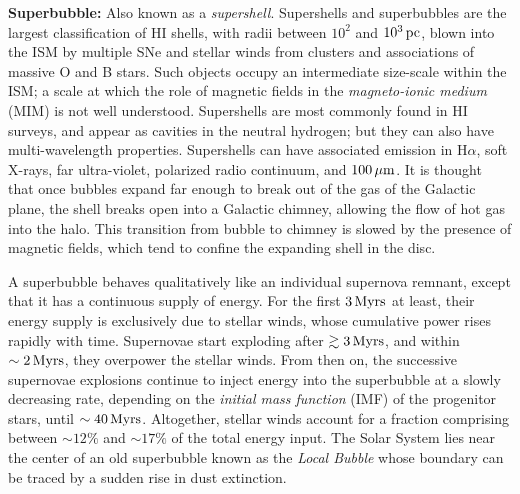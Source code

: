 \documentclass[a4paper,10pt]{article}
\begin{document}
{\noindent}\textbf{Superbubble:} Also known as a \textit{supershell}. Supershells and superbubbles are the largest classification of HI shells, with radii between $10^2$ and $10^3\,{\rm pc}$, blown into the ISM by multiple SNe and stellar winds from clusters and associations of massive O and B stars. Such objects occupy an intermediate size-scale within the ISM; a scale at which the role of magnetic fields in the \textit{magneto-ionic medium} (MIM) is not well understood. Supershells are most commonly found in HI surveys, and appear as cavities in the neutral hydrogen; but they can also have multi-wavelength properties. Supershells can have associated emission in H$\alpha$, soft X-rays, far ultra-violet, polarized radio continuum, and $100\,\mu{\rm m}$. It is thought that once bubbles expand far enough to break out of the gas of the Galactic plane, the shell breaks open into a Galactic chimney, allowing the flow of hot gas into the halo. This transition from bubble to chimney is slowed by the presence of magnetic fields, which tend to confine the expanding shell in the disc.

A superbubble behaves qualitatively like an individual supernova remnant, except that it has a continuous supply of energy. For the first $3\,{\rm Myrs}$ at least, their energy supply is exclusively due to stellar winds, whose cumulative power rises rapidly with time. Supernovae start exploding after $\gtrsim3\,{\rm Myrs}$, and within $\sim2\,{\rm Myrs}$, they overpower the stellar winds. From then on, the successive supernovae explosions continue to inject energy into the superbubble at a slowly decreasing rate, depending on the \textit{initial mass function} (IMF) of the progenitor stars, until $\sim40\,{\rm Myrs}$. Altogether, stellar winds account for a fraction comprising between $\sim12\%$ and $\sim17\%$ of the total energy input. The Solar System lies near the center of an old superbubble known as the \textit{Local Bubble} whose boundary can be traced by a sudden rise in dust extinction.
\end{document}

